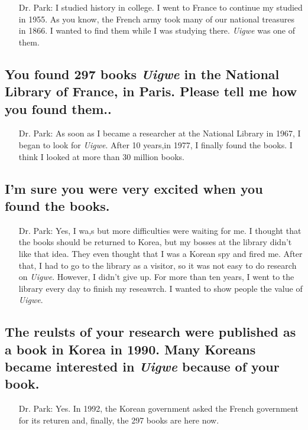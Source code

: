 \documentclass[9pt, a4paper]{oblivoir}
\begin{document}
    \begin{itemize}
        \item[Dr. Park:] I studied history in college. I went to France to continue my studied in 1955. As you know, the French army took many of our national treasures in 1866. I wanted to find them while I was studying there. \emph{Uigwe} was one of them.
    \end{itemize}

    \subsection*{You found 297 books \emph{Uigwe} in the National Library of France, in Paris. Please tell me how you found them..}

    \begin{itemize}
        \item[Dr. Park:] As soon as I became a researcher at the National Library in 1967, I began to look for \emph{Uigwe}. 
        After 10 years,in 1977, I finally found the books. I think I looked at more than 30 million books.
    \end{itemize}

    \subsection*{I'm sure you were very excited when you found the books.}
    \begin{itemize}
        \item[Dr. Park:] Yes, I wa,s but more difficulties were waiting for me. I thought that the books should be returned to Korea, but my bosses at the library didn't like that idea.
        They even thought that I was a Korean spy and fired me. After that, I had to go to the library as a visitor, so it was not easy to do research on \emph{Uigwe}. 
        However, I didn't give up. For more than ten years, I went to the library every day to finish my reseawrch. 
        I wanted to show people the value of \emph{Uigwe}.
    \end{itemize}

    \subsection*{The reulsts of your research were published as a book in Korea in 1990. Many Koreans became interested in \emph{Uigwe} because of your book.}

    \begin{itemize}
        \item[Dr. Park:] Yes. In 1992, the Korean government asked the French government for its returen and, finally, the 297 books are here now.
        

    \end{itemize}
    
\end{document}
